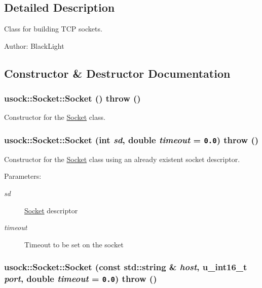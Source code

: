 \subsection{Detailed Description}
Class for building TCP sockets. 

\begin{Desc}
\item[Author:]BlackLight \end{Desc}


\subsection{Constructor \& Destructor Documentation}
\hypertarget{classusock_1_1Socket_41721da25729d31889ad3b3312da8532}{
\subsubsection[{Socket}]{\setlength{\rightskip}{0pt plus 5cm}usock::Socket::Socket ()  throw ()}}
\label{classusock_1_1Socket_41721da25729d31889ad3b3312da8532}


Constructor for the \hyperlink{classusock_1_1Socket}{Socket} class. 

\hypertarget{classusock_1_1Socket_157cd31365e1b52709a4abc2c9d7eb05}{
\subsubsection[{Socket}]{\setlength{\rightskip}{0pt plus 5cm}usock::Socket::Socket (int {\em sd}, \/  double {\em timeout} = {\tt 0.0})  throw ()}}
\label{classusock_1_1Socket_157cd31365e1b52709a4abc2c9d7eb05}


Constructor for the \hyperlink{classusock_1_1Socket}{Socket} class using an already existent socket descriptor. 

\begin{Desc}
\item[Parameters:]
\begin{description}
\item[{\em sd}]\hyperlink{classusock_1_1Socket}{Socket} descriptor \item[{\em timeout}]Timeout to be set on the socket \end{description}
\end{Desc}
\hypertarget{classusock_1_1Socket_12fa74b5a9eebcea247aa00a1236c0ee}{
\subsubsection[{Socket}]{\setlength{\rightskip}{0pt plus 5cm}usock::Socket::Socket (const std::string \& {\em host}, \/  u\_\-int16\_\-t {\em port}, \/  double {\em timeout} = {\tt 0.0})  throw ()}}
\label{classusock_1_1Socket_12fa74b5a9eebcea247aa00a1236c0ee}



